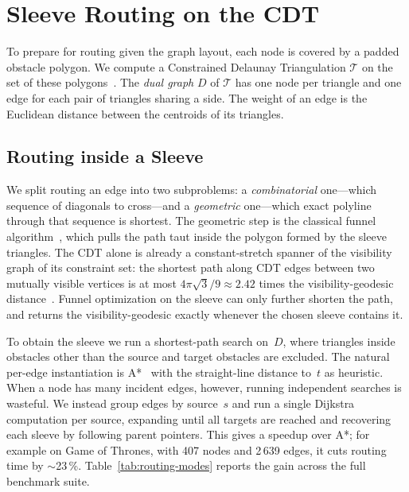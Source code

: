 \documentclass[a4paper,USenglish,anonymous]{gd-lipics-v3}
\newcommand{\cdt}{$\mathcal{T}$}
\begin{document}
\section{Sleeve Routing on the CDT}
\label{sec:sleeve-routing}

To prepare for routing given the graph layout, each node is covered by
a padded obstacle polygon. We compute a Constrained Delaunay
Triangulation \cdt{} on the set of these
polygons~\cite{delaunay1934sphere,domiter2008sweep}. The \emph{dual
graph} $D$ of \cdt{} has one node per triangle and one edge for each
pair of triangles sharing a side. The weight of an edge is the
Euclidean distance between the centroids of its triangles.

\subsection{Routing inside a Sleeve}
\label{sec:sleeve}

We split routing an edge into two subproblems: a \emph{combinatorial}
one---which sequence of diagonals to cross---and a \emph{geometric}
one---which exact polyline through that sequence is shortest. The
geometric step is the classical funnel
algorithm~\cite{chazelle1982theorem,hershberger1994computing}, which
pulls the path taut inside the polygon formed by the sleeve triangles.
The CDT alone is already a constant-stretch spanner of the visibility
graph of its constraint set: the shortest path along CDT edges between
two mutually visible vertices is at most $4\pi\sqrt{3}/9 \approx 2.42$
times the visibility-geodesic distance~\cite{bose2006stretch}. Funnel
optimization on the sleeve can only further shorten the path, and
returns the visibility-geodesic exactly whenever the chosen sleeve
contains it.

To obtain the sleeve we run a shortest-path search on~$D$, where
triangles inside obstacles other than the source and target obstacles
are excluded. The natural per-edge instantiation is
A*~\cite{hart1968formal} with the straight-line distance to~$t$ as
heuristic. When a node has many incident edges, however, running
independent searches is wasteful. We instead group edges by source~$s$
and run a single Dijkstra computation per source, expanding until all
targets are reached and recovering each sleeve by following parent
pointers. This gives a speedup over A*; for example on Game of Thrones,
with 407 nodes and 2\,639 edges, it cuts routing time by $\sim$23\,\%.
Table~\ref{tab:routing-modes} reports the gain across the full
benchmark suite.
\end{document}
